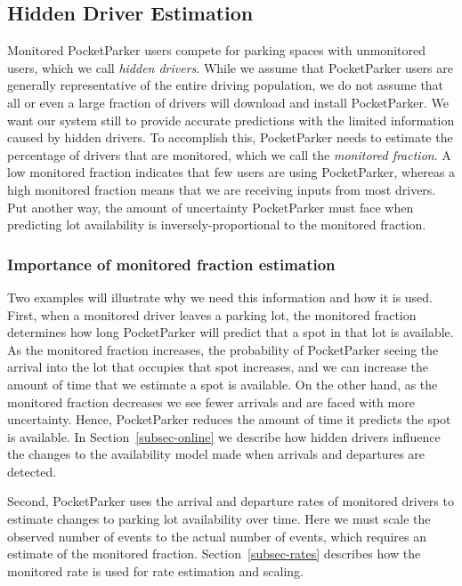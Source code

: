 \subsection{Hidden Driver Estimation}
\label{subsec-hidden}

Monitored PocketParker users compete for parking spaces with unmonitored
users, which we call \textit{hidden drivers}. While we assume that
PocketParker users are generally representative of the entire driving
population, we do not assume that all or even a large fraction of drivers
will download and install PocketParker. We want our system still to
provide accurate predictions with the limited information caused by hidden
drivers. To accomplish this, PocketParker needs to estimate the percentage of
drivers that are monitored, which we call the \textit{monitored fraction}.
 A low monitored fraction indicates that
few users are using PocketParker, whereas a high monitored fraction means
that we are receiving inputs from most drivers. Put another way, the amount
of uncertainty PocketParker must face when predicting lot availability is
inversely-proportional to the monitored fraction.

\subsubsection{Importance of monitored fraction estimation}

Two examples will illustrate why we need this information and how it is used.
First, when a monitored driver leaves a parking lot, the monitored fraction
determines how long PocketParker will predict that a spot in that lot is
available. As the monitored fraction increases, the probability of
PocketParker seeing the arrival into the lot that occupies that spot
increases, and we can increase the amount of time that we estimate a spot is
available. On the other hand, as the monitored fraction decreases we see
fewer arrivals and are faced with more uncertainty. Hence, PocketParker
reduces the amount of time it predicts the spot is available. In
Section~\ref{subsec-online} we describe how hidden drivers influence the
changes to the availability model made when arrivals and departures are
detected.

Second, PocketParker uses the arrival and departure rates of monitored
drivers to estimate changes to parking lot availability over time. Here we
must scale the observed number of events to the actual number of events,
which requires an estimate of the monitored fraction.
Section~\ref{subsec-rates} describes how the monitored rate is used for rate
estimation and scaling.

